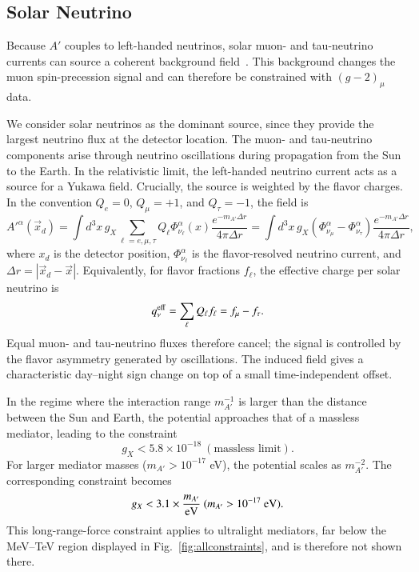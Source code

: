 \documentclass[onecolumn, aps, nofootinbib, prd, preprint, floats, floatfix, amsmath, amssymb, superscriptaddress, preprintnumbers]{revtex4-2}
\begin{document}
\subsection{Solar Neutrino}
Because $A'$ couples to left-handed neutrinos, solar muon- and tau-neutrino currents can source a coherent background field~\cite{Fang:2025fvo}. This background changes the muon spin-precession signal and can therefore be constrained with $(g-2)_\mu$ data.

We consider solar neutrinos as the dominant source, since they provide the largest neutrino flux at the detector location. The muon- and tau-neutrino components arise through neutrino oscillations during propagation from the Sun to the Earth.
In the relativistic limit, the left-handed neutrino current acts as a source for a Yukawa field. Crucially, the source is weighted by the flavor charges. In the convention $Q_e=0$, $Q_\mu=+1$, and $Q_\tau=-1$, the field is
\begin{equation}
A'^{\alpha}(\vec{x}_d)
=\int d^3x\,g_X
\sum_{\ell=e,\mu,\tau}Q_\ell\Phi_{\nu_\ell}^{\alpha}(x)
\frac{e^{-m_{A'}\Delta r}}{4\pi\Delta r}
=\int d^3x\,g_X
\left(\Phi_{\nu_\mu}^{\alpha}-\Phi_{\nu_\tau}^{\alpha}\right)
\frac{e^{-m_{A'}\Delta r}}{4\pi\Delta r},
\label{eq:axial-vector-potential}
\end{equation}
where $x_d$ is the detector position, $\Phi_{\nu_\ell}^{\alpha}$ is the flavor-resolved neutrino current, and $\Delta r=|\vec{x}_d-\vec{x}|$. Equivalently, for flavor fractions $f_\ell$, the effective charge per solar neutrino is
\begin{equation}
q_\nu^{\rm eff}=\sum_\ell Q_\ell f_\ell=f_\mu-f_\tau.
\end{equation}
Equal muon- and tau-neutrino fluxes therefore cancel; the signal is controlled by the flavor asymmetry generated by oscillations. The induced field gives a characteristic day--night sign change on top of a small time-independent offset.

In the regime where the interaction range $m^{-1}_{A'}$ is larger than the distance between the Sun and Earth, the potential approaches that of a massless mediator, leading to the constraint~\cite{Fang:2025fvo}
\begin{equation}
g_X < 5.8 \times 10^{-18}\  (\text{massless limit}). 
\end{equation}
For larger mediator masses ($m_{A'} > 10^{-17}$ eV), the potential scales as $m^{-2}_{A'}$. The corresponding constraint becomes~\cite{Fang:2025fvo}
\begin{equation}
g_X < 3.1 \times   \frac{ m_{A'}}{{\rm eV}}\ (m_{A'} > 10^{-17}\ \rm{eV}). 
\end{equation}
This long-range-force constraint applies to ultralight mediators, far below the MeV--TeV region displayed in Fig.~\ref{fig:allconstraints}, and is therefore not shown there.
\end{document}
